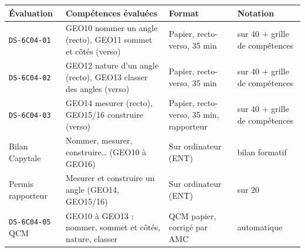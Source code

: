\documentclass[11pt]{article}
\newcommand{\doc}[1]{\texttt{\small #1}}
\begin{document}
\renewcommand{\arraystretch}{1.35}
\begin{tabularx}{\linewidth}{|>{\raggedright\arraybackslash}p{3.3cm}|>{\raggedright\arraybackslash}X|>{\raggedright\arraybackslash}p{3.6cm}|>{\raggedright\arraybackslash}p{3.2cm}|}
\hline
\textbf{Évaluation} & \textbf{Compétences évaluées} & \textbf{Format} & \textbf{Notation} \\ \hline
\doc{DS-6C04-01} & GEO10 nommer un angle (recto), GEO11 sommet et côtés (verso) & Papier, recto-verso, 35 min & sur 40 + grille de compétences \\ \hline
\doc{DS-6C04-02} & GEO12 nature d'un angle (recto), GEO13 classer des angles (verso) & Papier, recto-verso, 35 min & sur 40 + grille de compétences \\ \hline
\doc{DS-6C04-03} & GEO14 mesurer (recto), GEO15/16 construire (verso) & Papier, recto-verso, 35 min, rapporteur & sur 40 + grille de compétences \\ \hline
Bilan Capytale & Nommer, mesurer, construire\ldots{} (GEO10 à GEO16) & Sur ordinateur (ENT) & bilan formatif \\ \hline
Permis rapporteur & Mesurer et construire un angle (GEO14, GEO15/16) & Sur ordinateur (ENT) & sur 20 \\ \hline
\doc{DS-6C04-05} QCM & GEO10 à GEO13 : nommer, sommet et côtés, nature, classer & QCM papier, corrigé par AMC & automatique \\ \hline
\end{tabularx}
\end{document}
